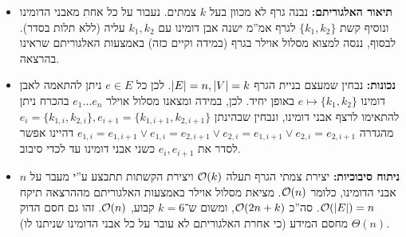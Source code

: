 \documentclass[]{../../../../tex/classes/homework}
\begin{document}
	\begin{itemize}
		\item \textbf{תיאור האלגוריתם: }נבנה גרף לא מכוון בעל $k$ צמתים. נעבור על כל אחת מאבני הדומינו ונוסיף קשת $\{k_1, k_2\}$ לגרף אמ''מ ישנה אבן דומינו עם $k_1, k_2$ עליה (ללא תלות בסדר). לבסוף, ננסה למצוא מסלול אוילר בגרף (במידה וקיים כזה) באמצעות האלגוריתם שראינו בהרצאה. 
		
		\item \textbf{נכונות: }נבחין שמעצם בניית הגרף $\left \lvert E \right \rvert = n, \left \lvert V \right \rvert = k$. לכן כל $e \in E$ ניתן להתאמה לאבן דומינו $e \mapsto \{k_1, k_2\}$ באופן יחיד. לכן, במידה ומצאנו מסלול אוילר $e_1 \dots e_n$ בהכרח ניתן להתאימו לרצף אבני דומינו, ונבחין שבהינתן $e_{i} = \{k_{1, i}, k_{2, i}\}, e_{i + 1} = \{k_{1, i + 1}, k_{2, i + 1}\}$ מהגדרה $e_{1, i} = e_{1, i + 1} \lor e_{1, i}  = e_{2, i + 1} \lor e_{2, i} = e_{1, i + 1} \lor e_{2, i} = e_{2, i + 1}$ דהיינו אפשר לסדר את $e_i, e_{i + 1}$ כשני אבני דומינו עד לכדי סיבוב. 
		
		\item \textbf{ניתוח סיבוכיות: }יצירת צמתי הגרף תעלה $\mathcal{O}(k)$ ויצירת הקשתות תתבצע ע''י מעבר על $n$ אבני הדומינו, כלומר $\mathcal{O}(n)$. מציאת מסלול אוילר באמצעות האלגוריתם מההרצאה תיקח $\mathcal{O}(\left \lvert E \right \rvert) = n$. סה''כ $\mathcal{O}(2n + k)$, ומשום ש־$k = 6$ קבוע, $\mathcal{O}(n)$. זהו גם חסם הדוק $\Theta(n)$ מחסם המידע (כי אחרת האלגוריתם לא עובר על כל אבני הדומינו שניתנו לו). 
	\end{itemize}
	
	\npage
\end{document}
